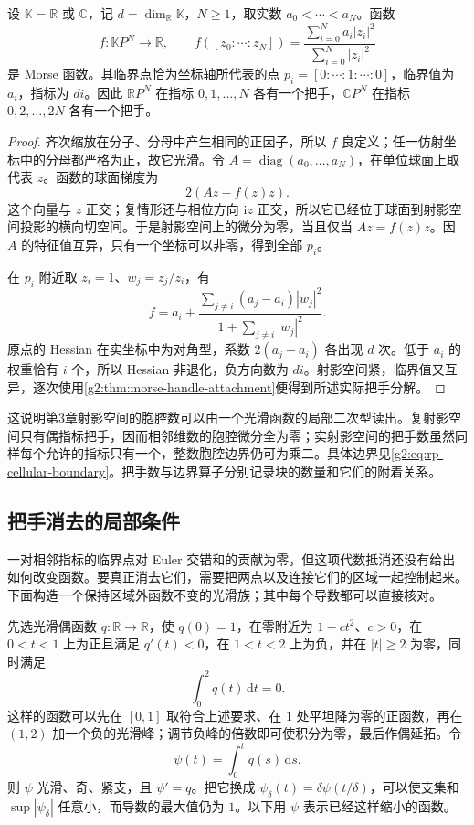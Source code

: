 \begin{proposition}\label{g2:prop:projective-morse-handles}
	设 \(\mathbb K=\mathbb R\) 或 \(\mathbb C\)，记 \(d=\dim_{\mathbb R}\mathbb K\)，\(N\ge1\)，取实数 \(a_0<\cdots<a_N\)。函数
	\[
		f:\mathbb KP^N\longrightarrow\mathbb R,\qquad
		f([z_0:\cdots:z_N])=\frac{\sum_{i=0}^N a_i|z_i|^2}{\sum_{i=0}^N|z_i|^2}
	\]
	是 Morse 函数。其临界点恰为坐标轴所代表的点 \(p_i=[0:\cdots:1:\cdots:0]\)，临界值为 \(a_i\)，指标为 \(di\)。因此 \(\mathbb RP^N\) 在指标 \(0,1,\ldots,N\) 各有一个把手，\(\mathbb CP^N\) 在指标 \(0,2,\ldots,2N\) 各有一个把手。
\end{proposition}
\begin{proof}
	齐次缩放在分子、分母中产生相同的正因子，所以 \(f\) 良定义；任一仿射坐标中的分母都严格为正，故它光滑。令 \(A=\operatorname{diag}(a_0,\ldots,a_N)\)，在单位球面上取代表 \(z\)。函数的球面梯度为
	\[
		2(Az-f(z)z).
	\]
	这个向量与 \(z\) 正交；复情形还与相位方向 \(\mathrm iz\) 正交，所以它已经位于球面到射影空间投影的横向切空间。于是射影空间上的微分为零，当且仅当 \(Az=f(z)z\)。因 \(A\) 的特征值互异，只有一个坐标可以非零，得到全部 \(p_i\)。

	在 \(p_i\) 附近取 \(z_i=1\)、\(w_j=z_j/z_i\)，有
	\[
		f=a_i+\frac{\sum_{j\ne i}(a_j-a_i)|w_j|^2}{1+\sum_{j\ne i}|w_j|^2}.
	\]
	原点的 Hessian 在实坐标中为对角型，系数 \(2(a_j-a_i)\) 各出现 \(d\) 次。低于 \(a_i\) 的权重恰有 \(i\) 个，所以 Hessian 非退化，负方向数为 \(di\)。射影空间紧，临界值又互异，逐次使用\cref{g2:thm:morse-handle-attachment}便得到所述实际把手分解。
\end{proof}

这说明第3章射影空间的胞腔数可以由一个光滑函数的局部二次型读出。复射影空间只有偶指标把手，因而相邻维数的胞腔微分全为零；实射影空间的把手数虽然同样每个允许的指标只有一个，整数胞腔边界仍可为乘二。具体边界见\eqref{g2:eq:rp-cellular-boundary}。把手数与边界算子分别记录块的数量和它们的附着关系。

\subsection{把手消去的局部条件}
\label{g2:subsec:1705:02}

一对相邻指标的临界点对 Euler 交错和的贡献为零，但这项代数抵消还没有给出如何改变函数。要真正消去它们，需要把两点以及连接它们的区域一起控制起来。下面构造一个保持区域外函数不变的光滑族；其中每个导数都可以直接核对。

\ProseParagraphBreak

先选光滑偶函数 \(q:\mathbb R\to\mathbb R\)，使 \(q(0)=1\)，在零附近为 \(1-ct^2\)、\(c>0\)，在 \(0<t<1\) 上为正且满足 \(q'(t)<0\)，在 \(1<t<2\) 上为负，并在 \(|t|\ge2\) 为零，同时满足
\[
	\int_0^2q(t)\,\mathrm dt=0.
\]
这样的函数可以先在 \([0,1]\) 取符合上述要求、在 \(1\) 处平坦降为零的正函数，再在 \((1,2)\) 加一个负的光滑峰；调节负峰的倍数即可使积分为零，最后作偶延拓。令
\[
	\psi(t)=\int_0^tq(s)\,\mathrm ds.
\]
则 \(\psi\) 光滑、奇、紧支，且 \(\psi'=q\)。把它换成 \(\psi_\delta(t)=\delta\psi(t/\delta)\)，可以使支集和 \(\sup|\psi_\delta|\) 任意小，而导数的最大值仍为 \(1\)。以下用 \(\psi\) 表示已经这样缩小的函数。

